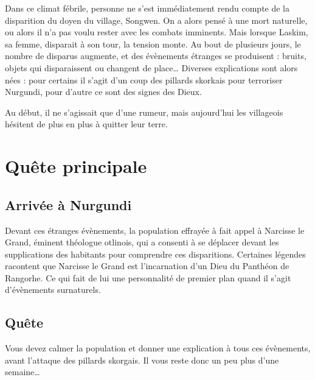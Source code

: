 \documentclass[french, a4paper, 12pt]{article}
\begin{document}
Dans ce climat fébrile, personne ne s'est immédiatement rendu compte de la disparition du doyen du village, Songwen. On a alors pensé à une mort naturelle, ou alors il n'a pas voulu rester avec les combats imminents. Mais lorsque Laskim, sa femme, disparait à son tour, la tension monte. Au bout de plusieurs jours, le nombre de disparus augmente, et des évènements étranges se produisent : bruits, objets qui disparaissent ou changent de place… Diverses explications sont alors nées : pour certains il s'agit d'un coup des pillards skorkais pour terroriser Nurgundi, pour d'autre ce sont des signes des Dieux.

Au début, il ne s'agissait que d'une rumeur, mais aujourd'hui les villageois hésitent de plus en plus à quitter leur terre.

\section{Quête principale}

\subsection{Arrivée à Nurgundi}

Devant ces étranges évènements, la population effrayée à fait appel à Narcisse le Grand, éminent théologue otlinois, qui a consenti à se déplacer devant les supplications des habitants pour comprendre ces disparitions. Certaines légendes racontent que Narcisse le Grand est l'incarnation d'un Dieu du Panthéon de Rangorhe. Ce qui fait de lui une personnalité de premier plan quand il s'agit d'évènements surnaturels.

\subsection{Quête}

Vous devez calmer la population et donner une explication à tous ces évènements, avant l'attaque des pillards skorgais. Il vous reste donc un peu plus d'une semaine…
\end{document}
